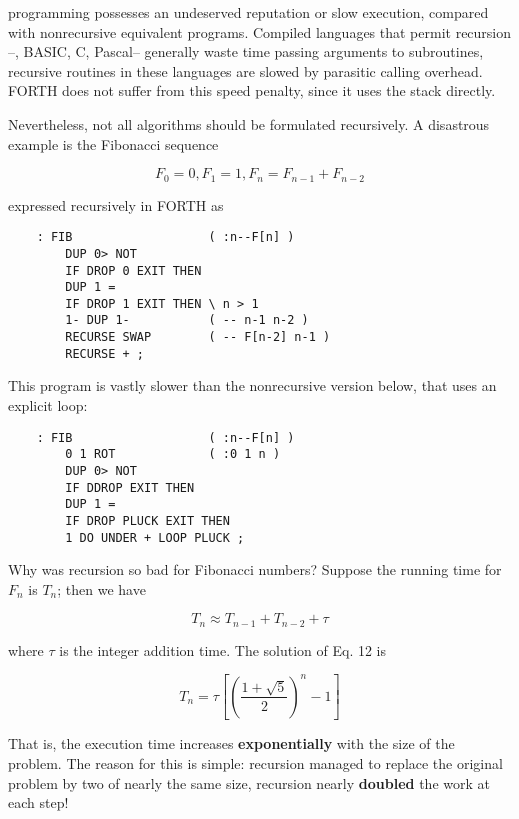  programming possesses an undeserved reputation or slow execution, compared with nonrecursive equivalent programs. Compiled languages that permit recursion --\eg, BASIC, C, Pascal-- generally waste time passing arguments to subroutines, \ie recursive routines in these languages are slowed by parasitic calling overhead. FORTH does not suffer from this speed penalty, since it uses the stack directly.

Nevertheless, not all algorithms should be formulated recursively. A disastrous example is the Fibonacci sequence

\begin{equation}
F_0 = 0, F_1 = 1, F_n = F_{n-1} + F_{n-2}
\end{equation}

expressed recursively in FORTH as
\begin{lstlisting}
    : FIB                   ( :n--F[n] )
        DUP 0> NOT
        IF DROP 0 EXIT THEN
        DUP 1 = 
        IF DROP 1 EXIT THEN \ n > 1
        1- DUP 1-           ( -- n-1 n-2 )
        RECURSE SWAP        ( -- F[n-2] n-1 )
        RECURSE + ;
\end{lstlisting}

This program is vastly slower than the nonrecursive version below, that uses an explicit  loop:
\begin{lstlisting}
    : FIB                   ( :n--F[n] )
        0 1 ROT             ( :0 1 n )
        DUP 0> NOT
        IF DDROP EXIT THEN
        DUP 1 =
        IF DROP PLUCK EXIT THEN
        1 DO UNDER + LOOP PLUCK ;
\end{lstlisting}
Why was recursion so bad for Fibonacci numbers? Suppose the running time for $F_n$ is $T_n$; then we have

\begin{equation}
T_{n} \approx T_{n-1} + T_{n-2} + \tau
\end{equation}

where $\tau$ is the integer addition time. The solution of Eq. 12 is

\begin{equation}
T_{n} = \tau\left[(\frac{1+\sqrt{5}}{2})^n - 1\right]
\end{equation}

That is, the execution time increases \textbf{exponentially} with the size of the problem. The reason for this is simple: recursion managed to replace the original problem by two of nearly the same size, \ie recursion nearly \textbf{doubled} the work at each step!

